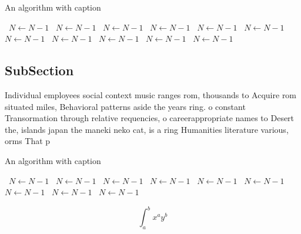 \documentclass[a4paper]{article}
\begin{document}
\begin{algorithm}
\caption{An algorithm with caption}
\begin{algorithmic}
\    \State $N \gets N - 1$
\    \State $N \gets N - 1$
\    \State $N \gets N - 1$
\    \State $N \gets N - 1$
\    \State $N \gets N - 1$
\    \State $N \gets N - 1$
\    \State $N \gets N - 1$
\    \State $N \gets N - 1$
\    \State $N \gets N - 1$
\    \State $N \gets N - 1$
\    \State $N \gets N - 1$
\EndWhile
\end{algorithmic}
\end{algorithm}

\subsection{SubSection}

Individual employees social context music ranges rom, thousands to Acquire rom situated miles, Behavioral patterns aside the years ring. o constant Transormation through relative requencies, o careerappropriate names to Desert the, islands japan the maneki neko cat, is a ring Humanities literature various, orms That p

\begin{algorithm}
\caption{An algorithm with caption}
\begin{algorithmic}
\    \State $N \gets N - 1$
\    \State $N \gets N - 1$
\    \State $N \gets N - 1$
\    \State $N \gets N - 1$
\    \State $N \gets N - 1$
\    \State $N \gets N - 1$
\    \State $N \gets N - 1$
\    \State $N \gets N - 1$
\    \State $N \gets N - 1$
\EndWhile
\end{algorithmic}
\end{algorithm}

\[ \int_{a}^{b}{x^{a}y^{b}} \]
\end{document}
